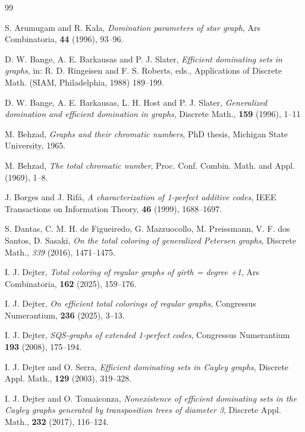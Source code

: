 \documentclass[12pt,reqno]{article}
\begin{document}
\begin{thebibliography}{99}

 S. Arumugam and R. Kala, {\it Domination parameters of star graph}, Ars Combinatoria,  {\bf 44} (1996), 93--96.

 D. W. Bange, A. E. Barkausas and P. J. Slater, {\it Efficient dominating sets in graphs}, in: R. D. Ringeisen and F. S. Roberts, eds., Applications of Discrete Math. (SIAM, Philadelphia, 1988) 189--199.

 D. W. Bange, A. E. Barkausas, L. H.  Host and P. J. Slater, {\it Generalized domination and
efficient domination in graphs}, Discrete Math., {\bf 159} (1996), 1--11

 M. Behzad, {\it Graphs and their chromatic numbers}, PhD thesis, Michigan State University, 1965.

 M. Behzad, {\it The total chromatic number}, Proc. Conf. Combin. Math. and Appl. (1969), 1--8. 

 J. Borges and J. Rif\'a, {\it A characterization of 1-perfect additive codes}, IEEE Transactions on Information Theory, {\bf 46} (1999), 1688--1697. 

 S. Dantas, C. M. H. de Figueiredo, G. Mazzuocollo, M. Preissmann, V. F. dos Santos, D. Sasaki, {\it On the total coloring of generalized Petersen graphs}, Discrete Math., {\it 339} (2016), 1471--1475.

 I. J. Dejter, {\it Total coloring of regular graphs of girth = degree +1}, Ars Combinatoria, {\bf 162} (2025), 159--176.

 I. J. Dejter, {\it On efficient total colorings of regular graphs}, Congressus Numerantium, {\bf 236} (2025), 3--13.

 I. J. Dejter, {\it SQS-graphs of extended 1-perfect codes}, Congressus Numerantium {\bf 193} (2008), 175--194.


 I. J. Dejter and O. Serra, {\it Efficient dominating sets in Cayley graphs}, Discrete Appl. Math., {\bf 129} (2003), 319--328.

 I. J. Dejter and O. Tomaiconza, {\it Nonexistence of efficient dominating sets in the Cayley graphs generated by transposition trees of diameter 3}, Discrete Appl. Math., {\bf 232} (2017), 116--124.


\end{thebibliography}
\end{document}
